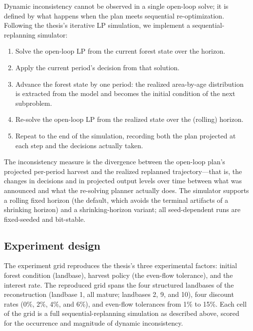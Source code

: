 \documentclass[12pt]{article}
\begin{document}
Dynamic inconsistency cannot be observed in a single open-loop solve; it is defined by what happens when the plan meets sequential re-optimization. Following the thesis's iterative LP simulation, we implement a sequential-replanning simulator:

\begin{enumerate}
\def\labelenumi{\arabic{enumi}.}
\tightlist
\item
  Solve the open-loop LP from the current forest state over the horizon.
\item
  Apply the current period's decision from that solution.
\item
  Advance the forest state by one period: the realized area-by-age distribution is extracted from the model and becomes the initial condition of the next subproblem.
\item
  Re-solve the open-loop LP from the realized state over the (rolling) horizon.
\item
  Repeat to the end of the simulation, recording both the plan projected at each step and the decisions actually taken.
\end{enumerate}

The inconsistency measure is the divergence between the open-loop plan's projected per-period harvest and the realized replanned trajectory---that is, the changes in decisions and in projected output levels over time between what was announced and what the re-solving planner actually does. The simulator supports a rolling fixed horizon (the default, which avoids the terminal artifacts of a shrinking horizon) and a shrinking-horizon variant; all seed-dependent runs are fixed-seeded and bit-stable.

\hypertarget{experiment-design}{%
\subsection{Experiment design}\label{experiment-design}}

The experiment grid reproduces the thesis's three experimental factors: initial forest condition (landbase), harvest policy (the even-flow tolerance), and the interest rate. The reproduced grid spans the four structured landbases of the reconstruction (landbase 1, all mature; landbases 2, 9, and 10), four discount rates (0\%, 2\%, 4\%, and 6\%), and even-flow tolerances from 1\% to 15\%. Each cell of the grid is a full sequential-replanning simulation as described above, scored for the occurrence and magnitude of dynamic inconsistency.
\end{document}
